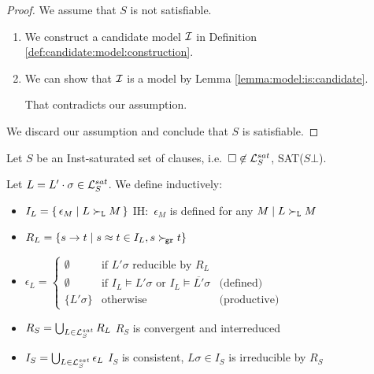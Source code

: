         \begin{proof} We assume that \(S\) is not satisfiable.
            \begin{enumerate}
                \item We construct a candidate model \(\mathcal{I}\) in Definition \vref{def:candidate:model:construction}.
                \item We can show that \(\mathcal{I}\) is a model by Lemma \vref{lemma:model:is:candidate}.

                That contradicts our assumption.
            \end{enumerate}
            We discard our assumption and conclude that \(S\) is satisfiable.
            \end{proof}

    \begin{definition}\label{def:candidate:model:construction}

        Let \(S\) be an Inst-saturated set of clauses,
        i.e.~\(\square\not\in\mathcal{L}_S^{sat}\), SAT(\(S\bot\)).

        Let \(L = L'\cdot\sigma \in\mathcal{L}_S^{sat}\).
        We define inductively:

            \begin{itemize}
                \item \(I_L = \{\,\epsilon_M\mid L\mathrel\succ_{\mathtt{L}} M\,\}\)
                \hfill  IH:~\(\epsilon_M\) is defined for any \(M\mid L\mathrel\succ_{\mathtt{L}} M\)

                \item \(R_L = \{ s \to t \mid s\approx t\in I_L, s\mathrel\succ_{\!\mathtt{gr}} t \}\)

                    \item $\epsilon_L = \left\{
                        \begin{array}{cll}
                            \emptyset &\text{if }
                            L'\sigma\text{ reducible by }R_L
                            \\
                            \emptyset &\text{if }
                            I_L\vDash L'\sigma
                            \text{ or }
                            I_L\vDash \overline{L'}\sigma
                            &\text{(defined)}
                            \\
                            \{ L'\sigma \}
                            &\text{otherwise}
                            &\text{(productive)}
                        \end{array}
                    \right.$

                \item
                \(R_S = \bigcup_{L\in\mathcal{L}_S^{sat}} R_L\)
                \hfill
                \(R_S\) is convergent and interreduced

                \item
                \(I_S = \bigcup_{L\in\mathcal{L}_S^{sat}} \epsilon_L\)
                \hfill
                \(I_S\) is consistent,
                \(L\sigma\in I_S\) is irreducible by \(R_S\)
            \end{itemize}
        \end{definition}

